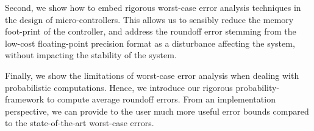 Second, we show how to embed rigorous worst-case error analysis techniques in the design of micro-controllers.
%
This allows us to sensibly reduce the memory foot-print of the controller, and address the roundoff error stemming from the low-cost floating-point precision format as a disturbance affecting the system, without impacting the stability of the system.
%

%
Finally, we show the limitations of worst-case error analysis when dealing with probabilistic computations. 
%
Hence, we introduce our rigorous probability-framework to compute average roundoff errors.
%
From an implementation perspective, we can provide to the user much more useful error bounds compared to the state-of-the-art worst-case errors.